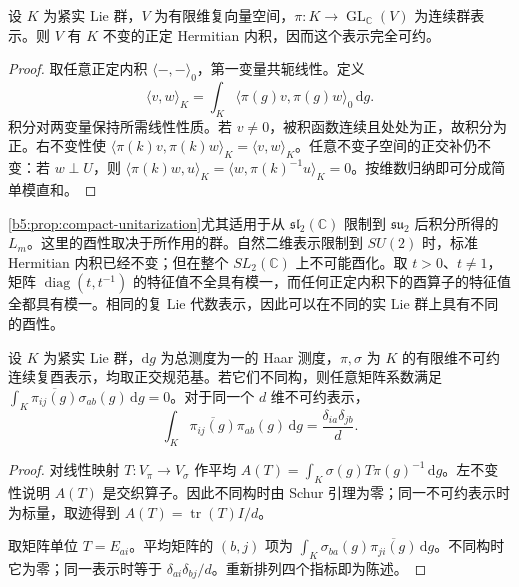 \begin{proposition}\label{b5:prop:compact-unitarization}
	设 \(K\) 为紧实 Lie 群，\(V\) 为有限维复向量空间，\(\pi:K\to\operatorname{GL}_{\mathbb C}(V)\) 为连续群表示。则 \(V\) 有 \(K\) 不变的正定 Hermitian 内积，因而这个表示完全可约。
\end{proposition}
\begin{proof}
	取任意正定内积 \(\langle-,-\rangle_0\)，第一变量共轭线性。定义
	\[
		\langle v,w\rangle_K =\int_K\bigl\langle\pi(g)v,\pi(g)w\bigr\rangle_0\,\mathrm{d}g.
	\]
	积分对两变量保持所需线性性质。若 \(v\ne0\)，被积函数连续且处处为正，故积分为正。右不变性使 \(\bigl\langle\pi(k)v,\pi(k)w\bigr\rangle_K=\langle v,w\rangle_K\)。任意不变子空间的正交补仍不变：若 \(w\perp U\)，则 \(\bigl\langle\pi(k)w,u\bigr\rangle_K=\bigl\langle w,\pi(k)^{-1}u\bigr\rangle_K=0\)。按维数归纳即可分成简单模直和。
\end{proof}

\cref{b5:prop:compact-unitarization}尤其适用于从 \(\mathfrak{sl}_2(\mathbb C)\) 限制到 \(\mathfrak{su}_2\) 后积分所得的 \(L_m\)。这里的酉性取决于所作用的群。自然二维表示限制到 \(SU(2)\) 时，标准 Hermitian 内积已经不变；但在整个 \(SL_2(\mathbb C)\) 上不可能酉化。取 \(t>0\)、\(t\ne1\)，矩阵 \(\operatorname{diag}(t,t^{-1})\) 的特征值不全具有模一，而任何正定内积下的酉算子的特征值全都具有模一。相同的复 Lie 代数表示，因此可以在不同的实 Lie 群上具有不同的酉性。

\begin{proposition}\label{b5:prop:compact-matrix-orthogonality}
	设 \(K\) 为紧实 Lie 群，\(\mathrm{d}g\) 为总测度为一的 Haar 测度，\(\pi,\sigma\) 为 \(K\) 的有限维不可约连续复酉表示，均取正交规范基。若它们不同构，则任意矩阵系数满足 \(\int_K\overline{\pi_{ij}(g)}\sigma_{ab}(g)\,\mathrm{d}g=0\)。对于同一个 \(d\) 维不可约表示，
	\[
		\int_K\overline{\pi_{ij}(g)}\pi_{ab}(g)\,\mathrm{d}g =\frac{\delta_{ia}\delta_{jb}}d.
	\]
\end{proposition}
\begin{proof}
	对线性映射 \(T:V_\pi\to V_\sigma\) 作平均 \(A(T)=\int_K\sigma(g)T\pi(g)^{-1}\,\mathrm{d}g\)。左不变性说明 \(A(T)\) 是交织算子。因此不同构时由 Schur 引理为零；同一不可约表示时为标量，取迹得到 \(A(T)=\operatorname{tr}(T)I/d\)。

	取矩阵单位 \(T=E_{ai}\)。平均矩阵的 \((b,j)\) 项为 \(\int_K\sigma_{ba}(g)\overline{\pi_{ji}(g)}\,\mathrm{d}g\)。不同构时它为零；同一表示时等于 \(\delta_{ai}\delta_{bj}/d\)。重新排列四个指标即为陈述。
\end{proof}


